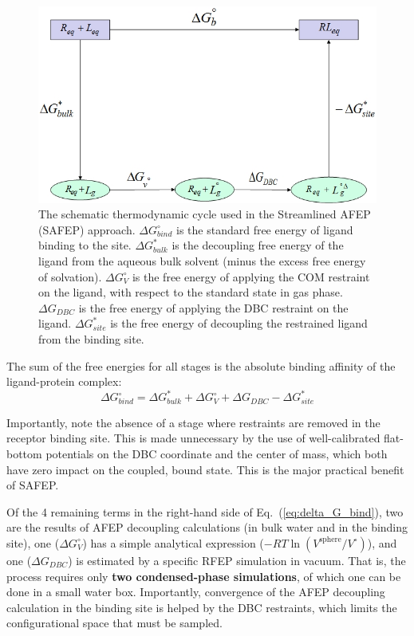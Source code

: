 \documentclass[9pt,tutorial]{livecoms}
\begin{document}
\begin{figure}[!ht]
\centering
\includegraphics[width=\linewidth]{thermo-cycle}
\caption{The schematic thermodynamic cycle used in the Streamlined AFEP (SAFEP) approach.
$\Delta G_{bind}^\circ$ is the standard free energy of ligand binding to the site.
$\Delta G^*_{bulk}$ is the decoupling free energy of the ligand from the aqueous bulk solvent (minus the excess free energy of solvation).
$\Delta G_V^\circ$ is the free energy of applying the COM restraint on the ligand, with respect to the standard state in gas phase.
$\Delta G_{DBC}$ is the free energy of applying the DBC restraint on the ligand.
$\Delta G^*_{site}$ is the free energy of decoupling the restrained ligand from the binding site.
}
\label{fig:cycle}
\end{figure}

The sum of the free energies for all stages is the absolute binding affinity of the ligand-protein complex:
\begin{equation}\label{eq:delta_G_bind}
    \Delta G_{bind}^\circ = \Delta G^*_{bulk} + \Delta G_V^\circ + \Delta G_{DBC} - \Delta G^*_{site}
\end{equation}

Importantly, note the absence of a stage where restraints are removed in the receptor binding site. This is made unnecessary by the use of well-calibrated flat-bottom potentials on the DBC coordinate and the center of mass, which both have zero impact on the coupled, bound state. This is the major practical benefit of SAFEP.

Of the 4 remaining terms in the right-hand side of Eq.~(\ref{eq:delta_G_bind}), 
two are the results of AFEP decoupling calculations (in bulk water and in the binding site), one ($\Delta G_V^\circ$) has a simple analytical expression ($-RT \ln (V^\mathrm{sphere}/V^\circ)$), and one ($\Delta G_{DBC}$) is estimated by a specific RFEP simulation in vacuum.
That is, the process requires only \textbf{two condensed-phase simulations}, of which one can be done in a small water box.
Importantly, convergence of the AFEP decoupling calculation in the binding site is helped by the DBC restraints, which limits the configurational space that must be sampled.\cite{Salari2018}
\end{document}
